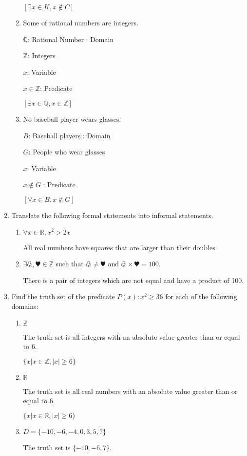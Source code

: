 \documentclass[12pt,letterpaper,titlepage]{article}
\begin{document}
\begin{raggedright}
\begin{enumerate}
\begin{enumerate}[label=(\alph*)]
$[\exists x \in K, x \notin C]$

\item Some of rational numbers are integers.

$\mathbb{Q}$: Rational Number : Domain

$\mathbb{Z}$: Integers

$x$: Variable

$x \in \mathbb{Z}$: Predicate

$[ \exists x \in \mathbb{Q}, x \in \mathbb{Z} ]$
\item No baseball player wears glasses.

$B$: Baseball players : Domain

$G$: People who wear glasses

$x$: Variable

$x \notin G$ : Predicate

$[ \forall x \in B, x \notin G ]$

\end{enumerate}


\item Translate the following formal statements into informal statements.
\begin{enumerate}[label=(\alph*)]
\item $\forall x \in \mathbb{R}, x^2 > 2x$

All real numbers have squares that are larger than their doubles.
\item $\exists \varclub, \varheart \in \mathbb{Z}$ such that $\varclub\neq\varheart$ and $\varclub\times\varheart = 100$.

There is a pair of integers which are not equal and have a product of 100.
\end{enumerate}

\item Find the truth set of the predicate $P(x) : x^2 \geq 36$ for each of the following domains:
\begin{enumerate}[label=(\alph*)]
\item $ \mathbb{Z}$

The truth set is all integers with an absolute value greater than or equal to 6.

$\{x|x \in \mathbb{Z}, |x| \geq 6 \}$
\item $ \mathbb{R}$

The truth set is all real numbers with an absolute value greater than or equal to 6.

$\{x|x \in \mathbb{R}, |x| \geq 6\}$
\item $D=\{-10, -6, -4, 0, 3, 5, 7\}$

The truth set is $\{-10, -6, 7\}$.
\end{enumerate}

\end{enumerate}
\end{raggedright}
\end{document}
